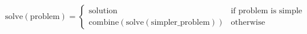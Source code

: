 \documentclass[preview]{standalone}
\begin{document}
\begin{align*}
\text{solve}(\text{problem}) = \begin{cases}\text{solution} & \text{if problem is simple} \\\text{combine}(\text{solve}(\text{simpler_problem})) & \text{otherwise}\end{cases}
\end{align*}
\end{document}
